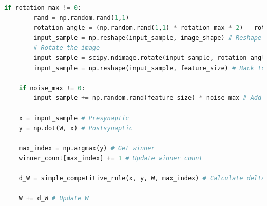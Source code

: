 \documentclass[11pt,journal,transmag,final]{IEEEtran}
\begin{document}
\begin{appendices}
\begin{lstlisting}[language=Python, caption=Competitive Learning Code, basicstyle=\footnotesize, label=code:nn]
    if rotation_max != 0:
        rand = np.random.rand(1,1)
        rotation_angle = (np.random.rand(1,1) * rotation_max * 2) - rotation_max
        input_sample = np.reshape(input_sample, image_shape) # Reshape to the image
        # Rotate the image
        input_sample = scipy.ndimage.rotate(input_sample, rotation_angle, reshape=False)
        input_sample = np.reshape(input_sample, feature_size) # Back to a flat vector
        
    if noise_max != 0:
        input_sample += np.random.rand(feature_size) * noise_max # Add noise

    x = input_sample # Presynaptic
    y = np.dot(W, x) # Postsynaptic

    max_index = np.argmax(y) # Get winner
    winner_count[max_index] += 1 # Update winner count

    d_W = simple_competitive_rule(x, y, W, max_index) # Calculate delta W

    W += d_W # Update W
        \end{lstlisting}
    \end{appendices}


     
    
\end{document}

